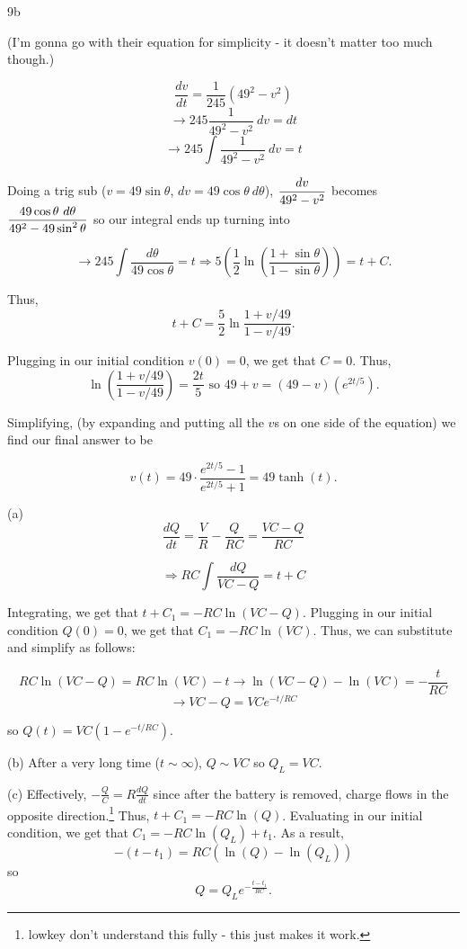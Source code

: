 \documentclass[../../diff_eqs.tex]{subfiles}
\begin{document}
\begin{exercise}{9b}
    
    (I'm gonna go with their equation for simplicity - it doesn't matter too much though.) 

    $$\frac{dv}{dt} = \frac{1}{245}\left(49^2 - v^2\right)$$
    $$\rightarrow 245 \frac{1}{49^2 - v^2} \ dv = dt$$ 
    $$\rightarrow 245 \int \frac{1}{49^2 - v^2} \ dv = t$$

    Doing a trig sub ($v = 49 \sin \theta$, $dv = 49 \cos \theta \ d\theta$), $\mathlarger{\frac{dv}{49^2 - v^2}}$ becomes $\mathlarger{\frac{49 \cos \theta \ d\theta}{49^2 - 49 \sin^2 \theta}}$ so our integral ends up turning into 

    $$\longrightarrow 245 \int \frac{d\theta}{49 \cos \theta} = t \Longrightarrow 5\left(\frac{1}{2} \ln\left(\frac{1 + \sin \theta}{1 - \sin \theta}\right)\right) = t + C\text{.}$$

    Thus, 
    $$t + C = \frac{5}{2} \ln \frac{1 + v/49}{1 - v/49}\text{.}$$ 

    Plugging in our initial condition $v(0) = 0$, we get that $C = 0$. Thus, $$\ln\left(\frac{1 + v/49}{1 - v/49}\right) = \frac{2t}{5} \text{ so } 49 + v = (49 - v)(e^{2t/5})\text{.}$$

    Simplifying, (by expanding and putting all the $v$s on one side of the equation) we find our final answer to be 
    
    $$v(t) = 49 \cdot \frac{e^{2t/5} - 1}{e^{2t/5} + 1} = 49\tanh(t)\text{.}$$

\end{exercise}

\begin{exercise}{13}
    
    (a)
    $$\frac{dQ}{dt} = \frac{V}{R} - \frac{Q}{RC} = \frac{VC - Q}{RC}$$

    $$\Rightarrow RC \int \frac{dQ}{VC - Q} = t + C$$

    Integrating, we get that $t + C_1 = -RC\ln(VC - Q)$. Plugging in our initial condition $Q(0) = 0$, we get that $C_1 = -RC\ln(VC)$. Thus, we can substitute and simplify as follows:

    $$RC \ln(VC - Q) = RC \ln(VC) - t \rightarrow \ln(VC - Q) - \ln(VC) = -\frac{t}{RC}$$
    $$\rightarrow VC - Q = VCe^{-t/RC}$$

    so $Q(t) = VC(1 - e^{-t/RC})$.

    \emspacer 

    (b) After a very long time ($t \sim \infty$), $Q \sim VC$ so $Q_L = VC$.

    \emspacer

    (c) Effectively, $-\frac{Q}{C} = R\frac{dQ}{dt}$ since after the battery is removed, charge flows in the opposite direction.\footnote{lowkey don't understand this fully - this just makes it work.} Thus, $t + C_1 = -RC\ln(Q)$. Evaluating in our initial condition, we get that $C_1 = -RC \ln(Q_L) + t_1$. As a result, $$-(t - t_1) = RC(\ln(Q) - \ln(Q_L))$$ so $$ Q = Q_L e^{-\frac{t - t_1}{RC}}\text{.}$$ 

\end{exercise}
\end{document}
